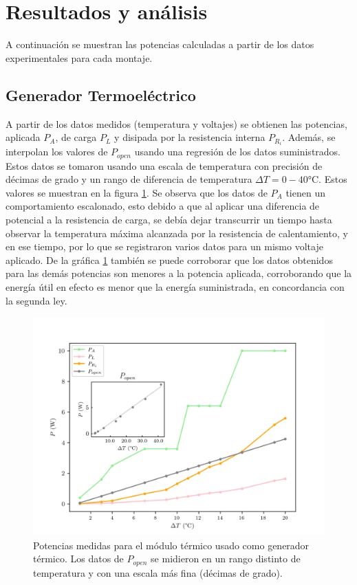\section{Resultados y análisis}

A continuación se muestran las potencias calculadas a partir de los datos experimentales para cada montaje. 
\subsection{Generador Termoeléctrico}

A partir de los datos medidos (temperatura y voltajes) se obtienen las potencias, aplicada $P_A$, de carga $P_L$ y disipada por la resistencia interna $P_{R_i}$. Además, se interpolan los valores de $P_{open}$ usando una regresión de los datos suministrados. Estos datos se tomaron usando una escala de temperatura con precisión de décimas de grado y un rango de diferencia de temperatura  $\Delta T = 0 - 40 \si{\celsius}$. Estos valores se muestran en la figura \ref{fig:gen_powers}. Se observa que los datos de $P_A$ tienen un comportamiento escalonado, esto debido a que al aplicar una diferencia de potencial a la resistencia de carga, se debía dejar transcurrir un tiempo hasta observar la temperatura máxima alcanzada por la resistencia de calentamiento, y en ese tiempo, por lo que se registraron varios datos para un mismo voltaje aplicado. De la gráfica \ref{fig:gen_powers} también se puede corroborar que los datos obtenidos para las demás potencias son menores a la potencia aplicada, corroborando que la energía útil en efecto es menor que la energía suministrada, en concordancia con la segunda ley.

\begin{figure}[ht]
    \centering
    \includegraphics[width = 0.6\linewidth]{img/gen_powers.png}
    \caption{Potencias medidas para el módulo térmico usado como generador térmico. Los datos de $P_{open}$ se midieron en un rango distinto de temperatura y con una escala más fina (décimas de grado).}
    \label{fig:gen_powers}
\end{figure}

